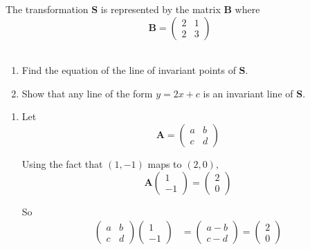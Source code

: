 \documentclass[leqno]{article}
\begin{document}
\begin{enumerate}[
  label=\textbf{\arabic*.},
  leftmargin=*,
  topsep=0pt,
  partopsep=0pt,
  parsep=0pt
]
The transformation $\mathbf{S}$ is represented by the matrix $\mathbf{B}$ where
\[
\mathbf{B} = \begin{pmatrix}2 & 1 \\ 2 & 3\end{pmatrix}
\] \\
\begin{enumerate}[label=(\roman*), resume]
  \item Find the equation of the line of invariant points of $\mathbf{S}$.  \\
  \item Show that any line of the form $y = 2x + c$ is an invariant line of $\mathbf{S}$.  \\
\end{enumerate}

\vspace*{30pt}

\begin{tcolorbox}[colback=white, colframe=scarlet, title={\textbf{Solution}}, breakable, grow to left by=6mm, grow to right by=10mm]
\begin{enumerate}[label=\textbf{(\roman*)}]
\item Let
\[
\mathbf A=\begin{pmatrix}a&b\\ c&d\end{pmatrix}
\]

Using the fact that $(1,-1)$ maps to $(2,0)$,
\[
\mathbf A\begin{pmatrix}1\\-1\end{pmatrix}
=
\begin{pmatrix}2\\0\end{pmatrix}
\]

So
\begin{align*}
\begin{pmatrix}a&b\\ c&d\end{pmatrix}
\begin{pmatrix}1\\-1\end{pmatrix}
&=
\begin{pmatrix}a-b\\ c-d\end{pmatrix}
=
\begin{pmatrix}2\\0\end{pmatrix}
\end{align*}


\end{enumerate}
\end{tcolorbox}
\end{enumerate}
\end{document}
